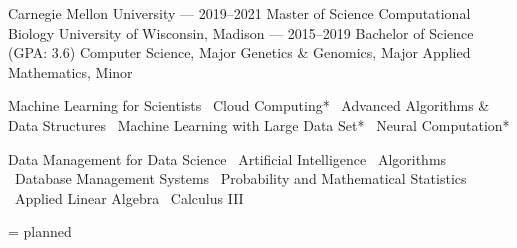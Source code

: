 \documentclass[10pt, letterpaper]{awesome-cv}
\begin{document}
\makecvheader
\begin{minipage}[t]{0.5\textwidth}
\begin{cventries}
    \cvgrad
        {Carnegie Mellon University --- \normalsize{2019--2021}}
        {Master of Science}
        {Computational Biology}
    \cvundergrad
        {University of Wisconsin, Madison --- \normalsize{2015--2019}}
        {Bachelor of Science (GPA: 3.6)}
        {Computer Science, Major}
        {Genetics \& Genomics, Major}
        {Applied Mathematics, Minor}
\end{cventries}
\end{minipage}
\begin{minipage}[t]{0.5\textwidth}
\newcommand{\sep}{\textbar \ }
\cvsectionline \bodyfont 
{}
Machine Learning for Scientists
\sep Cloud Computing*
\sep Advanced Algorithms \& Data Structures
\sep Machine Learning with Large Data Set*
\sep Neural Computation*

\vspace*{2em}
Data Management for Data Science 
\sep Artificial Intelligence 
\sep Algorithms 
\sep Database Management Systems 
\sep Probability and Mathematical Statistics
\sep Applied Linear Algebra
\sep Calculus III

\vspace*{0.5em}
\begin{flushright}
    \small * = planned
\end{flushright}
\vspace*{-2em}
\end{minipage}
\end{document}
